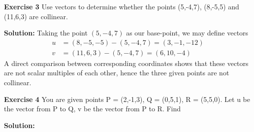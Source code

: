 \documentclass[12pt,oneside]{exam}
\newenvironment{exercise}[1]{\vspace{.1in}\noindent\textbf{Exercise #1 \hspace{.05em}}}{}
\newenvironment{newsolution}{\vspace{.1in}\noindent\textbf{Solution: \hspace{.05em}}}{}
\begin{document}
\begin{exercise}{3}
Use vectors to determine whether the points (5,-4,7), (8,-5,5) and (11,6,3) are collinear.
\end{exercise}

\begin{newsolution}
Taking the point $(5,-4,7)$ as our base-point, we may define vectors 
\begin{align*}
u & = (8,-5,-5) - (5,-4,7) = (3,-1,-12) \\
v & = (11,6,3) - (5,-4,7) = (6,10,-4)
\end{align*}
A direct comparison between corresponding coordinates shows that these vectors are not scalar multiples of each other, hence the three given points are not collinear. 
\end{newsolution} 

\begin{exercise}{4}
You are given points P = (2,-1,3), Q = (0,5,1), R = (5,5,0). Let u be the vector from P to Q, v be the vector from P to R. Find
\end{exercise}

\begin{newsolution}
\end{newsolution}
\end{document}
